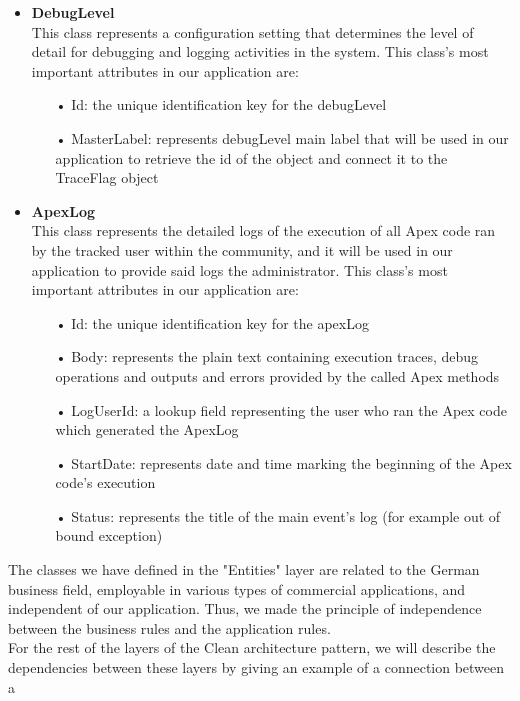 \begin{itemize}
\begin{itemize}
\end{itemize}
\item \textbf{DebugLevel}\\
This class represents a configuration setting that determines the level of detail for debugging and logging activities in the system. This class's most important attributes in our application are:
\begin{itemize}
\item[•] Id: the unique identification key for the debugLevel
\item[•] MasterLabel: represents debugLevel main label that will be used in our application to retrieve the id of the object and connect it to the TraceFlag object

\end{itemize}
\item \textbf{ApexLog}\\
This class represents the detailed logs of the execution of all Apex code ran by the tracked user within the community, and it will be used in our application to provide said logs the administrator. This class's most important attributes in our application are:
\begin{itemize}
\item[•] Id: the unique identification key for the apexLog
\item[•] Body: represents the plain text containing execution traces, debug operations and outputs and errors provided by the called Apex methods
\item[•] LogUserId: a lookup field representing the user who ran the Apex code which generated the ApexLog
\item[•] StartDate: represents date and time marking the beginning of the Apex code's execution
\item[•] Status: represents the title of the main event's log (for example out of bound exception)

\end{itemize}
\end{itemize}
The classes we have defined in the "Entities" layer are related to the German business field, employable in various types of commercial applications, and
independent of our application. Thus, we made the
principle of independence between the business rules and the application rules.\\
For the rest of the layers of the Clean architecture pattern, we will describe
the dependencies between these layers by giving an example of a connection between a

